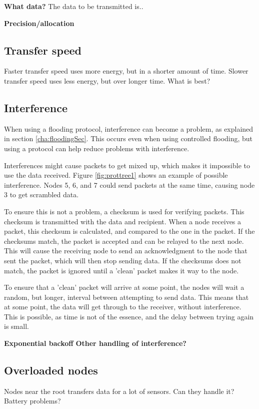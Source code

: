 \textbf{What data?}\newline
The data to be transmitted is..

\textbf{Precision/allocation}

\subsection{Transfer speed}
Faster transfer speed uses more energy, but in a shorter amount of time. Slower transfer speed uses less energy, but over longer time. What is best?

\subsection{Interference}
When using a flooding protocol, interference can become a problem, as explained in section \ref{cha:floodingSec}. This occurs even when using controlled flooding, but using a protocol can help reduce problems with interference.

Interferences might cause packets to get mixed up, which makes it impossible to use the data received. Figure \ref{fig:prottree1} shows an example of possible interference. Nodes 5, 6, and 7 could send packets at the same time, causing node 3 to get scrambled data.

To ensure this is not a problem, a checksum is used for verifying packets. This checksum is transmitted with the data and recipient. When a node receives a packet, this checksum is calculated, and compared to the one in the packet. If the checksums match, the packet is accepted and can be relayed to the next node. This will cause the receiving node to send an acknowledgment to the node that sent the packet, which will then stop sending data.
If the checksums does not match, the packet is ignored until a 'clean' packet makes it way to the node.

To ensure that a 'clean' packet will arrive at some point, the nodes will wait a random, but longer, interval between attempting to send data. This means that at some point, the data will get through to the receiver, without interference.
This is possible, as time is not of the essence, and the delay between trying again is small.

\textbf{Exponential backoff}\newline
\textbf{Other handling of interference?}

\subsection{Overloaded nodes}
Nodes near the root transfers data for a lot of sensors. Can they handle it? Battery problems?

